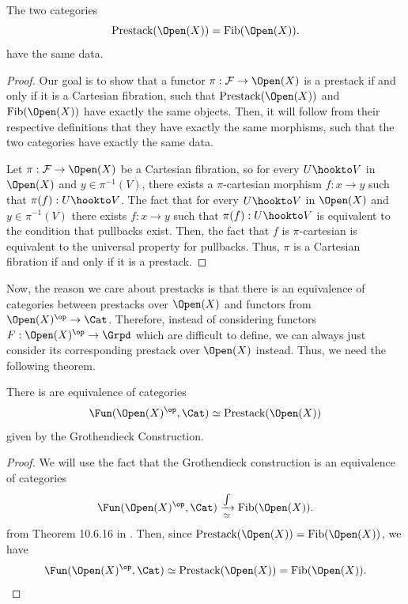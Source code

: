 \begin{theorem}
    The two categories 
    $$
    \text{Prestack}(\Open(X)) = \text{Fib}(\Open(X)).
    $$
    have the same data.
\end{theorem}

\begin{proof}
    Our goal is to show that a functor $\pi: \mathcal{F} \to \Open(X)$ is a prestack if and only if it is a Cartesian fibration, such that $\text{Prestack}(\Open(X))$ and $\text{Fib}(\Open(X))$ have exactly the same objects. Then, it will follow from their respective definitions that they have exactly the same morphisms, such that the two categories have exactly the same data. 

    Let $\pi: \mathcal{F} \to \Open(X)$ be a Cartesian fibration, so for every $U \hookto V$ in $\Open(X)$ and $y \in \pi^{-1}(V)$, there exists a $\pi$-cartesian morphism $f: x \to y$ such that $\pi(f): U \hookto V$. The fact that for every $U \hookto V$ in $\Open(X)$ and $y \in \pi^{-1}(V)$ there exists $f: x \to y$ such that $\pi(f): U \hookto V$ is equivalent to the condition that pullbacks exist. Then, the fact that $f$ is $\pi$-cartesian is equivalent to the universal property for pullbacks. Thus, $\pi$ is a Cartesian fibration if and only if it is a prestack.
\end{proof}


Now, the reason we care about prestacks is that there is an equivalence of categories between prestacks over $\Open(X)$ and functors from $\Open(X)^\op \to \Cat$. Therefore, instead of considering functors $F: \Open(X)^\op \to \Grpd$ which are difficult to define, we can always just consider its corresponding prestack over $\Open(X)$ instead. Thus, we need the following theorem.

\begin{theorem}\label{thm:eqFunPrestack}
    There is are equivalence of categories
    \[ \Fun(\Open(X)^\op,\Cat) \simeq \text{Prestack}(\Open(X)) \]
    given by the Grothendieck Construction.
\end{theorem}

\begin{proof}
    We will use the fact that the Grothendieck construction is an equivalence of categories
    $$
    \Fun(\Open(X)^\op,\Cat) \xrightarrow[\simeq]{\int} \text{Fib}(\Open(X)).
    $$
    from Theorem 10.6.16 in \cite{johnsonyau2DimensionalCategories2021}. Then, since $\text{Prestack}(\Open(X)) = \text{Fib}(\Open(X))$, we have 
    $$
    \Fun(\Open(X)^\op,\Cat) \simeq \text{Prestack}(\Open(X)) = \text{Fib}(\Open(X)).
    $$
\end{proof}

